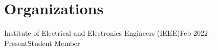 \section{Organizations}
\resumeSubHeadingListStart

\resumeOrganizationHeading
{Institute of Electrical and Electronics Engineers (IEEE)}{Feb 2022 -- Present}{Student Member}

\resumeSubHeadingListEnd
